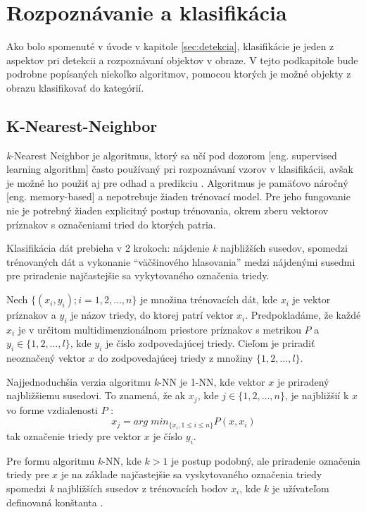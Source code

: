 
\section{Rozpoznávanie a klasifikácia}
\label{sec:klasifikacia}

Ako bolo spomenuté v úvode v kapitole \ref{sec:detekcia}, klasifikácie je jeden z aspektov pri detekcii a rozpoznávaní objektov v obraze.
V tejto podkapitole bude podrobne popísaných niekoľko algoritmov, pomocou ktorých je možné objekty z obrazu klasifikovať do kategórií.



\subsection{K-Nearest-Neighbor}
\textit{k}-Nearest Neighbor je algoritmus, ktorý sa učí pod dozorom [eng. supervised learning algorithm] často používaný pri rozpoznávaní vzorov v klasifikácii,
avšak je možné ho použiť aj pre odhad a predikciu \cite{book:DataMining}.
Algoritmus je pamäťovo náročný [eng. memory-based] a nepotrebuje žiaden trénovací model.
Pre jeho fungovanie nie je potrebný žiaden explicitný postup trénovania, okrem zberu vektorov príznakov s označeniami tried do ktorých patria.

Klasifikácia dát prebieha v 2 krokoch: nájdenie \textit{k} najbližších susedov, spomedzi trénovaných dát a
vykonanie ``väčšinového hlasovania'' medzi nájdenými susedmi pre priradenie najčastejšie sa vykytovaného označenia triedy.

Nech $\{ (x_i, y_i); i = 1, 2, \dots, n \}$ je množina trénovacích dát, kde $x_i$ je vektor príznakov a $y_i$ je názov triedy, do ktorej patrí vektor $x_i$.
Predpokladáme, že každé $x_i$ je v určitom multidimenzionálnom priestore príznakov s metrikou $P$ a $y_i \in \{ 1, 2, \dots, l \}$, kde $y_i$ je číslo zodpovedajúcej triedy.
Cieľom je priradiť neoznačený vektor $x$ do zodpovedajúcej triedy z množiny $\{ 1, 2, \dots, l \}$.

Najjednoduchšia verzia algoritmu \textit{k}-NN je 1-NN, kde vektor $x$ je priradený najbližšiemu susedovi.
To znamená, že ak $x_j$, kde $j \in \{ 1, 2, \dots, n \}$, je najbližšií k $x$ vo forme vzdialenosti $P$ \cite{prop:KnnClassification}:
\begin{equation}
    \label{eq:kNNMetric}
    x_j = arg \; min_{\{x_i, 1 \leq i \leq n\}} P(x, x_i)
\end{equation}
tak označenie triedy pre vektor $x$ je číslo $y_i$.

Pre formu algoritmu \textit{k}-NN, kde $k > 1$ je postup podobný, ale priradenie označenia triedy pre $x$ je na základe najčastejšie sa vyskytovaného označenia triedy
spomedzi \textit{k} najbližších susedov z trénovacích bodov $x_i$, kde $k$ je užívateľom definovaná konštanta \cite{prop:KnnClassification}.

